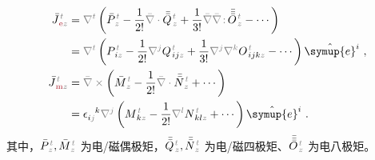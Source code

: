 \begin{subequations} \label{eq:J-em}
\begin{align}
	\bar{J}^{\;\!\mathcolor{gray}{t}}_{\;\!\textcolor{Maroon}{\text{e}}\mathcolor{gray}{z}} &= \mathcolor{gray}{\nabla^t} \left( \bar{P}^{\;\!\mathcolor{gray}{t}}_{\;\!\mathcolor{gray}{z}} - \frac{1}{2!} \mathcolor{gray}{\bar{\nabla} \cdot} \bar{\bar{Q}}^{\;\!\mathcolor{gray}{t}}_{\;\!\mathcolor{gray}{z}} + \frac{1}{3!} \mathcolor{gray}{\bar{\nabla}} \mathcolor{gray}{\bar{\nabla} \colon}\! \bar{\bar{\bar{O}}}^{\;\!\mathcolor{gray}{t}}_{\;\!\mathcolor{gray}{z}} - \cdots \right) \label{eq:J-e} \\ 
	&= \mathcolor{gray}{\nabla^t} \left( P^{\;\!\mathcolor{gray}{t}}_{\;\! i\mathcolor{gray}{z}} - \frac{1}{2!} \mathcolor{gray}{\nabla^j} Q^{\;\!\mathcolor{gray}{t}}_{\;\! ij\mathcolor{gray}{z}} + \frac{1}{3!} \mathcolor{gray}{\nabla^j} \mathcolor{gray}{\nabla^k} O^{\;\!\mathcolor{gray}{t}}_{\;\! ijk\mathcolor{gray}{z}} - \cdots \right) \hat{\symup{e}}^i~, \label{eq:j-e} \\ 
	\bar{J}^{\;\!\mathcolor{gray}{t}}_{\;\!\textcolor{Maroon}{\text{m}}\mathcolor{gray}{z}} &= \mathcolor{gray}{\bar{\nabla} \times} \left( \bar{M}^{\;\!\mathcolor{gray}{t}}_{\;\!\mathcolor{gray}{z}} - \frac{1}{2!} \mathcolor{gray}{\bar{\nabla} \cdot} \bar{\bar{N}}^{\;\!\mathcolor{gray}{t}}_{\;\!\mathcolor{gray}{z}} + \cdots \right) \label{eq:J-m} \\ 
	&= \epsilon^{\hphantom{ij}k}_{i\mathcolor{gray}{j}} \mathcolor{gray}{\nabla^j} \left( M^{\;\!\mathcolor{gray}{t}}_{\;\! k\mathcolor{gray}{z}} - \frac{1}{2!} \mathcolor{gray}{\nabla^l} N^{\;\!\mathcolor{gray}{t}}_{\;\! kl\mathcolor{gray}{z}} + \cdots \right) \hat{\symup{e}}^i~. \label{eq:j-m}
\end{align}
\end{subequations}
其中，$\bar{P}^{\;\!\mathcolor{gray}{t}}_{\;\!\mathcolor{gray}{z}}, \bar{M}^{\;\!\mathcolor{gray}{t}}_{\;\!\mathcolor{gray}{z}}$ 为电/磁偶极矩，$\bar{\bar{Q}}^{\;\!\mathcolor{gray}{t}}_{\;\!\mathcolor{gray}{z}}, \bar{\bar{N}}^{\;\!\mathcolor{gray}{t}}_{\;\!\mathcolor{gray}{z}}$ 为电/磁四极矩、$\bar{\bar{\bar{O}}}^{\;\!\mathcolor{gray}{t}}_{\;\!\mathcolor{gray}{z}}$ 为电八极矩。

